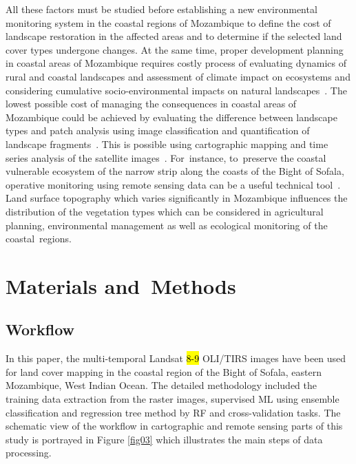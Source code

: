 \documentclass[coasts,article,accept,pdftex,oneauthor]{Definitions/mdpi}
\begin{document}
All these factors must be studied before establishing a new environmental monitoring system in the coastal regions of Mozambique to define the cost of landscape restoration in the affected areas and {to }determine if the selected land cover types undergone changes. {At the same time, }proper development planning in coastal areas of Mozambique requires {costly process of }evaluating dynamics of rural and coastal landscapes and {assessment} of{ }climate impact on ecosystems and considering cumulative socio-environmental impacts on natural landscapes~\cite{SMITH2019101976,LUNDGREN2022103023,SILVA201843,MARTINS2022102793}.{ The }lowest possible cost of managing the consequences in coastal areas of Mozambique could be achieved by evaluating the difference between{ }landscape types and patch analysis using image classification and quantification of landscape fragments~\cite{PITTMAN2023}. This is possible using cartographic mapping and time series analysis of the satellite images~\cite{XI2019111212,ABIDI2023106152,MOHAMMADI2023272}. For~instance, to~preserve the coastal vulnerable ecosystem of the narrow strip along the coasts of the Bight of Sofala, operative monitoring using remote sensing data can be a useful technical tool~\cite{NAMAGANDA2023117811}. Land surface topography which varies significantly in Mozambique influences the distribution of the vegetation types which can be considered in agricultural planning, environmental management as well as ecological monitoring of the coastal~regions. 

\section{Materials and~Methods}
\unskip

\subsection{Workflow}
In this paper, {the} multi-temporal Landsat \hl{8-9} OLI/TIRS images {have been} used for land cover mapping in the coastal region of the Bight of Sofala, eastern Mozambique, West Indian Ocean. {The detailed methodology included the training data extraction from the raster images, supervised ML using ensemble classification and regression tree method by RF and cross-validation tasks}.  {The schematic view of the workflow in cartographic and remote sensing parts of this study is portrayed in Figure} \ref{fig03} {which illustrates the main steps of data processing}.
\end{document}
